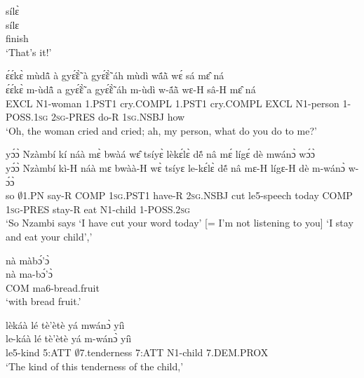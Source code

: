 \begin{exe} 
\exN\label{70}
  \glll sílɛ̀ \\
        sílɛ \\
         finish   \\
    \trans `That's it!'
\end{exe}

\begin{exe} 
\exN\label{71}
  \glll  ɛ́ɛ́kɛ̀ mùdã̂ à gyɛ̃́ɛ̃̀ à gyɛ̃́ɛ̃̀ áh mùdì wã́ã̀ wɛ́ sá mɛ̂ ná \\
        ɛ́ɛ́kɛ̀ m-ùdã̂ a gyɛ̃́ɛ̃̀ a gyɛ̃́ɛ̃̀ áh m-ùdì w-ã́ã̀ wɛ-H sâ-H mɛ̂ ná \\
          EXCL N1-woman 1.PST1 cry.COMPL 1.PST1 cry.COMPL EXCL N1-person 1-POSS.1\textsc{sg} 2\textsc{sg}-PRES do-R 1\textsc{sg}.NSBJ how \\
    \trans `Oh, the woman cried and cried; ah, my person, what do you do to me?'
\end{exe}

\begin{exe} 
\exN\label{72}
  \glll  yɔ́ɔ̀ Nzàmbí kí náà mɛ̀ bwàá wɛ̂ tsíyɛ̀ lèkɛ́lɛ̀ dẽ́ nâ mɛ́ lígɛ́ dè mwánɔ̀ wɔ́ɔ̀ \\
       yɔ́ɔ̀ Nzàmbí kì-H náà mɛ bwàà-H wɛ̀ tsíyɛ le-kɛ́lɛ̀ dẽ́ nâ mɛ-H lígɛ-H dè m-wánɔ̀ w-ɔ́ɔ̀ \\
         so $\emptyset$1.PN say-R COMP 1\textsc{sg}.PST1 have-R 2\textsc{sg}.NSBJ cut le5-speech today COMP 1\textsc{sg}-PRES stay-R eat N1-child 1-POSS.2\textsc{sg}\\
    \trans `So Nzambi says `I have cut your word today' [= I'm not listening to you] `I stay and eat your child','
\end{exe}

\begin{exe} 
\exN\label{73}
  \glll nà màbɔ́'ɔ̀ \\
        nà ma-bɔ́'ɔ̀ \\
        COM ma6-bread.fruit\\
    \trans `with bread fruit.'
\end{exe}

\begin{exe} 
\exN\label{74}
  \glll lèkáà lé tè'ètè yá mwánɔ̀ yíì \\
          le-káà lé tè'ètè yá m-wánɔ̀ yíì \\
          le5-kind 5:ATT $\emptyset$7.tenderness 7:ATT N1-child 7.DEM.PROX  \\
    \trans `The kind of this tenderness of the child,'
\end{exe}

